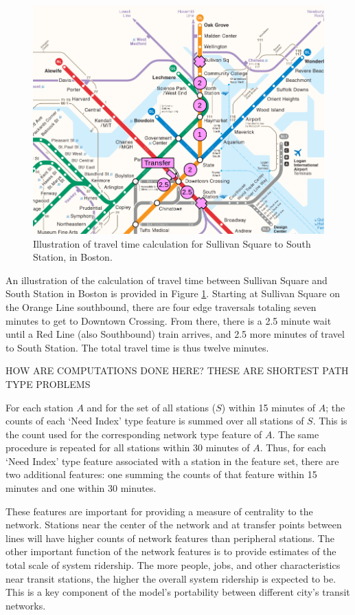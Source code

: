 \documentclass[11pt]{article}
\begin{document}
\begin{figure}
\begin{center}\includegraphics[scale=0.7]{transfer_demonstration}\end{center}\caption{Illustration of travel time calculation for Sullivan Square to South Station, in Boston.}\label{fig:f2}
\end{figure}

An illustration of the calculation of travel time between Sullivan Square and South Station in Boston is provided in Figure \ref{fig:f2}. Starting at Sullivan Square on the Orange Line southbound, there are four edge traversals totaling seven minutes to get to Downtown Crossing. From there, there is a 2.5 minute wait until a Red Line (also Southbound) train arrives, and 2.5 more minutes of travel to South Station. The total travel time is thus twelve minutes. 

HOW ARE COMPUTATIONS DONE HERE? THESE ARE SHORTEST PATH TYPE PROBLEMS

For each station $A$ and for the set of all stations ($S$) within 15 minutes of $A$; the counts of each `Need Index' type feature is summed over all stations of $S$. This is the count used for the corresponding network type feature of $A$. The same procedure is repeated for all stations within 30 minutes of $A$. Thus, for each `Need Index' type feature associated with a station in the feature set, there are two additional features: one summing the counts of that feature within 15 minutes and one within 30 minutes.

These features are important for providing a measure of centrality to the network. Stations near the center of the network and at transfer points between lines will have higher counts of network features than peripheral stations. The other important function of the network features is to provide estimates of the total scale of system ridership. The more people, jobs, and other characteristics near transit stations, the higher the overall system ridership is expected to be. This is a key component of the model's portability between different city's transit networks. 
\end{document}
